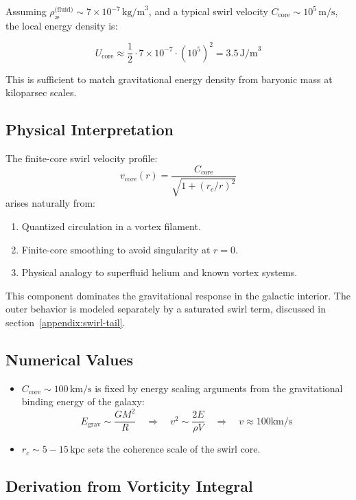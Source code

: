 \documentclass[12pt]{article}
\begin{document}
Assuming \( \rho_{\text{\ae}}^{\text{(fluid)}} \sim 7 \times 10^{-7}\, \text{kg/m}^3 \), and a typical swirl velocity \( C_{\text{core}} \sim 10^5\, \text{m/s} \), the local energy density is:

\[
U_{\text{core}} \approx \frac{1}{2} \cdot 7 \times 10^{-7} \cdot (10^5)^2 = 3.5\, \text{J/m}^3
\]

This is sufficient to match gravitational energy density from baryonic mass at kiloparsec scales.

\subsection{Physical Interpretation}

The finite-core swirl velocity profile:
\[
\boxed{
v_\text{core}(r) = \frac{C_{\text{core}}}{\sqrt{1 + (r_c/r)^2}}
}
\]
arises naturally from:
\begin{enumerate}
    \item Quantized circulation in a vortex filament.
    \item Finite-core smoothing to avoid singularity at \( r = 0 \).
    \item Physical analogy to superfluid helium and known vortex systems.
\end{enumerate}

This component dominates the gravitational response in the galactic interior. The outer behavior is modeled separately by a saturated swirl term, discussed in section~\ref{appendix:swirl-tail}.

\subsection{Numerical Values}

\begin{itemize}
    \item \( C_{\text{core}} \sim 100\,\text{km/s} \) is fixed by energy scaling arguments from the gravitational binding energy of the galaxy:
    \[
    E_{\text{grav}} \sim \frac{GM^2}{R} \quad \Rightarrow \quad v^2 \sim \frac{2E}{\rho V} \quad \Rightarrow \quad v \approx 100 \text{km/s}
    \]
    \item \( r_c \sim 5 - 15\,\text{kpc} \) sets the coherence scale of the swirl core.
\end{itemize}

\subsection{Derivation from Vorticity Integral}
\end{document}
